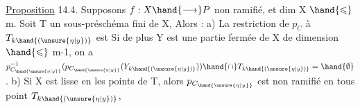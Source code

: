 \uline{Proposition} 14.4. Supposons $f:X\hand{\longrightarrow} P$ non ramifié, et dim X $\hand{\leqslant}$ m.
Soit T un sous-préschéma fini de X, Alors :
 a)  La restriction de $p_C$ à $T_{k\hand{(\unsure{\eta|y})}}$ est   Si de
plus Y est une partie fermée de X de dimension $\hand{\leqslant}$ m-1, on a
$p_{C_{\hand{\unsure{\eta|y}}}}^{-1}(p_{C_{\hand{\unsure{\eta|y}}}}(Y_{k\hand{(\unsure{\eta|y})}})) \hand{\cap} T_{k\hand{(\unsure{\eta|y})}} = \hand{\emptyset}$ .
b) Si X est lisse en les points de T, alors $p_{C_{\hand{\unsure{\eta|y}}}}$ est non ramifié
en tous point  $T_{k\hand{(\unsure{\eta|y})}}$,  
